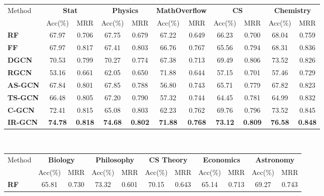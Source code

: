 \documentclass[smallcondensed]{svjour3}     %
\begin{document}
\begin{table}[h]
  \centering
  \begin{tabular}{l|c c|c c|c c|c c|c c}
     \toprule
     \multirow{2}{*}{Method} &
        \multicolumn{2}{c}{\textbf{Stat}} &
       \multicolumn{2}{c}{\textbf{Physics}} &
       \multicolumn{2}{c}{\textbf{MathOverflow}} &
       \multicolumn{2}{c}{\textbf{CS}} &
       \multicolumn{2}{c}{\textbf{Chemistry}}\\
       &{Acc(\%)} & {MRR}&{Acc(\%)} & {MRR}&{Acc(\%)}& {MRR}&{Acc(\%)} & {MRR}&{Acc(\%)} & {MRR}\\
       \midrule
       \textbf{RF~\cite{BurelMA16,TianZL13}}&67.97&0.706&67.75&0.679&67.22&0.649&66.23&0.700&68.04&0.759\\

\textbf{FF~\cite{JendersKN16}}&67.97&0.817&67.41&0.803&66.76&0.767&65.56&0.794&68.31&0.836\\

\textbf{DGCN~\cite{DualGCN}}&70.53&0.799&70.27&0.774&67.38&0.713&69.49&0.806&73.52&0.826\\

\textbf{RGCN~\cite{relationalGCN}}&53.16&0.661&62.05&0.650&71.88&0.644&57.15&0.701&57.46&0.729\\

      \cmidrule(lr){1-1}\cmidrule(lr){2-11}
      \textbf{AS-GCN}&67.84&0.801&67.85&0.788&56.80&0.743&65.71&0.779&67.82&0.823\\

\textbf{TS-GCN}&66.48&0.805&67.20&0.790&57.32&0.744&64.45&0.781&64.99&0.832\\

\textbf{C-GCN}&72.41&0.815&65.08&0.803&62.23&0.762&69.76&0.796&73.52&0.845\\

\textbf{IR-GCN}&\textbf{74.78}&\textbf{0.818}&\textbf{74.68}&\textbf{0.802}&\textbf{71.88}&\textbf{0.768}&\textbf{73.12}&\textbf{0.809}&\textbf{76.58}&\textbf{0.848}\\
     \bottomrule
   \end{tabular}\\
   \begin{tabular}{l|c c|c c|c c|c c|c c}
      \toprule
      \multirow{2}{*}{Method} &
         \multicolumn{2}{c}{\textbf{Biology}} &
        \multicolumn{2}{c}{\textbf{Philosophy}} &
        \multicolumn{2}{c}{\textbf{CS Theory}} &
        \multicolumn{2}{c}{\textbf{Economics}} &
        \multicolumn{2}{c}{\textbf{Astronomy}}\\
        &{Acc(\%)} & {MRR}&{Acc(\%)} & {MRR}&{Acc(\%)}& {MRR}&{Acc(\%)} & {MRR}&{Acc(\%)} & {MRR}\\
        \midrule
        \textbf{RF~\cite{BurelMA16,TianZL13}}&65.81&0.730&73.32&0.601&70.15&0.643&65.14&0.713&69.27&0.743\\


\end{tabular}
\end{table}
\end{document}
